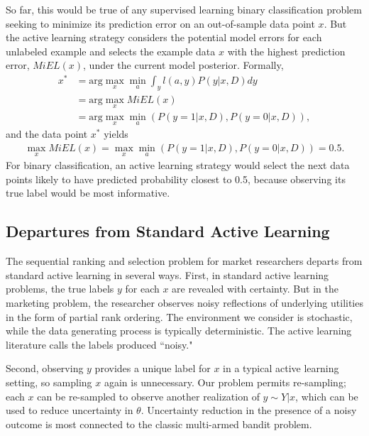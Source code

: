 \documentclass[nonblindrev]{informs3}
\begin{document}
So far, this would be true of any supervised learning binary classification problem seeking to minimize its prediction error on an out-of-sample data point $x$. But the active learning strategy considers the potential model errors for each unlabeled example and selects the example data $x$ with the highest prediction error, $MiEL(x)$, under the current model posterior. Formally,
\begin{align}
x^{*}  &= \text{arg} \max_{x} \min_{a} \int_y l(a,y) P(y|x,D) dy \\
&= \text{arg} \max_{x} MiEL(x) \\
& =  \text{arg} \max_{x} \min_{a} \left( P(y=1|x,D), P(y=0|x,D) \right),
\end{align}
and the data point $x^{*}$ yields
\begin{align}
\max_{x} MiEL(x) = \max_{x} \min_{a} \left( P(y=1|x,D), P(y=0|x,D) \right) = 0.5 .
\end{align}
For binary classification, an active learning strategy would select the next data points likely to have predicted probability closest to 0.5, because observing its true label would be most informative.





\subsection{Departures from Standard Active Learning}

The sequential ranking and selection problem for market researchers departs from standard active learning in several ways. First, in standard active learning problems, the true labels $y$ for each $x$ are revealed with certainty. But in the marketing problem, the researcher observes noisy reflections of underlying utilities in the form of partial rank ordering. The environment we consider is stochastic, while the data generating process is typically deterministic. The active learning literature \citep{GolovinEtAl2010noisy,NatarajanEtAl2013noisy} calls the labels produced ``noisy."

Second, observing $y$ provides a unique label for $x$ in a typical active learning setting, so sampling $x$ again is unnecessary. Our problem permits re-sampling; each $x$ can be re-sampled to observe another realization of $y \sim Y|x$, which can be used to reduce uncertainty in $\theta$. Uncertainty reduction in the presence of a noisy outcome is most connected to the classic multi-armed bandit problem. 
\end{document}
